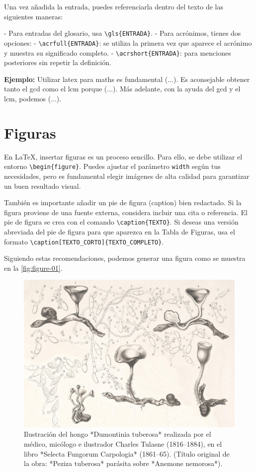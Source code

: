 Una vez añadida la entrada, puedes referenciarla dentro del texto de las siguientes maneras:

- Para entradas del glosario, usa \verb|\gls{ENTRADA}|.
- Para acrónimos, tienes dos opciones:
  - \verb|\acrfull{ENTRADA}|: se utiliza la primera vez que aparece el acrónimo y muestra su significado completo.
  - \verb|\acrshort{ENTRADA}|: para menciones posteriores sin repetir la definición.

\vspace{.875em}
\textbf{Ejemplo:} Utilizar \Gls{latex} para \Gls{maths} es fundamental (...). Es aconsejable obtener tanto el \acrfull{gcd} como el \acrfull{lcm} porque (...). Más adelante, con la ayuda del \acrshort{gcd} y el \acrshort{lcm}, podemos (...).

\section{Figuras}

En \LaTeX, insertar figuras es un proceso sencillo. Para ello, se debe utilizar el entorno \verb|\begin{figure}|. Puedes ajustar el parámetro \verb|width| según tus necesidades, pero es fundamental elegir imágenes de alta calidad para garantizar un buen resultado visual.

También es importante añadir un pie de figura (caption) bien redactado. Si la figura proviene de una fuente externa, considera incluir una cita o referencia. El pie de figura se crea con el comando \verb|\caption{TEXTO}|. Si deseas una versión abreviada del pie de figura para que aparezca en la Tabla de Figuras, usa el formato \verb|\caption[TEXTO_CORTO]{TEXTO_COMPLETO}|.

Siguiendo estas recomendaciones, podemos generar una figura como se muestra en la \autoref{fig:figure-01}.

\begin{figure}[!htpb]
    \centering
    \includegraphics[width=\linewidth]{Figures/PezizaTuberosa.jpg}
    \caption[Ilustración del hongo Dumontinia tuberosa.]{Ilustración del hongo *Dumontinia tuberosa* realizada por el médico, micólogo e ilustrador Charles Tulasne (1816–1884), en el libro *Selecta Fungorum Carpologia* (1861–65). (Título original de la obra: *Peziza tuberosa* parásita sobre *Anemone nemorosa*).}
    \label{fig:figure-01}
\end{figure}

